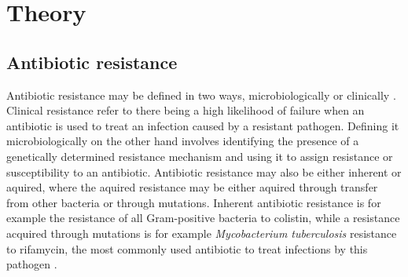 \chapter{Theory}


% 

\section{Antibiotic resistance}
Antibiotic resistance may be defined in two ways, microbiologically or clinically \cite{macgowan2017AntibioticResistance}.
Clinical resistance refer to there being a high likelihood of failure when an antibiotic is used to treat an infection caused by a resistant pathogen. 
Defining it microbiologically on the other hand involves identifying the presence of a genetically determined resistance mechanism and using it to assign resistance or susceptibility to an antibiotic.
Antibiotic resistance may also be either inherent or aquired, where the aquired resistance may be either aquired through transfer from other bacteria or through mutations. 
Inherent antibiotic resistance is for example the resistance of all Gram-positive bacteria to colistin, while a resistance acquired through mutations is for example \emph{Mycobacterium tuberculosis} resistance to rifamycin, the most commonly used antibiotic to treat infections by this pathogen \cite{molodtsov2017StructuralBasisRifamycin}. 

